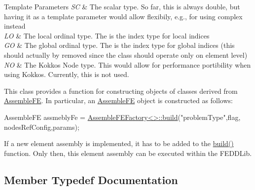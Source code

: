 \begin{DoxyTemplParams}{Template Parameters}
{\em SC} & The scalar type. So far, this is always double, but having it as a template parameter would allow flexibily, e.\+g., for using complex instead \\
\hline
{\em LO} & The local ordinal type. The is the index type for local indices \\
\hline
{\em GO} & The global ordinal type. The is the index type for global indices (this should actually by removed since the class should operate only on element level) \\
\hline
{\em NO} & The Kokkos Node type. This would allow for performance portibility when using Kokkos. Currently, this is not used.\\
\hline
\end{DoxyTemplParams}
This class provides a function for constructing objects of classes derived from \hyperlink{classFEDD_1_1AssembleFE}{Assemble\+FE}. In particular, an \hyperlink{classFEDD_1_1AssembleFE}{Assemble\+FE} object is constructed as follows\+: 
\begin{DoxyCode}
AssembleFE assmeblyFe = \hyperlink{classFEDD_1_1AssembleFEFactory_ac895d65acf2626100832586df84d6a9c}{AssembleFEFactory<>::build}(\textcolor{stringliteral}{"problemType"},flag,
      nodesRefConfig,params);
\end{DoxyCode}
 If a new element assembly is implemented, it has to be added to the \hyperlink{classFEDD_1_1AssembleFEFactory_ac895d65acf2626100832586df84d6a9c}{build()} function. Only then, this element assembly can be executed within the F\+E\+D\+D\+Lib. 

\subsection{Member Typedef Documentation}
\mbox{\label{classFEDD_1_1AssembleFEFactory_a42c8b5387f23fea233cb2c9b2bfc379f}} 
